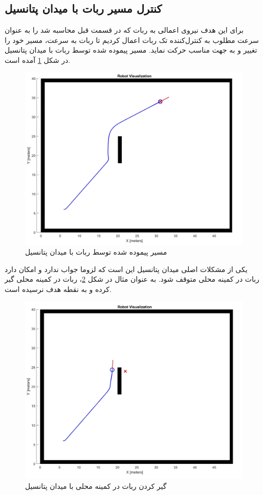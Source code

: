\subsection{کنترل مسیر ربات با میدان پتانسیل}
برای این هدف نیروی اعمالی به ربات که در قسمت قبل محاسبه شد را به عنوان سرعت مطلوب به کنترل‌کننده تک ربات اعمال کردیم تا ربات به سرعت، مسیر خود را تغییر و به جهت مناسب حرکت نماید. مسیر پیموده شده توسط ربات با میدان پتانسیل در شکل \ref{Fig potential-field-1robot-pos} آمده است.
\begin{figure}[!h]
	\centering
	\includegraphics[scale=0.28]{Images/potential-field-1robot-pos.jpg}
	\caption{مسیر پیموده شده توسط ربات با میدان پتانسیل}\label{Fig potential-field-1robot-pos}
\end{figure}

یکی از مشکلات اصلی میدان پتانسیل این است که لزوما جواب ندارد و امکان دارد ربات در کمینه محلی متوقف شود. به عنوان مثال در شکل \ref{Fig potential-field-1robot-stuck}، ربات در کمینه محلی گیر کرده و به نقطه هدف نرسیده است.
\begin{figure}[!h]
	\centering
	\includegraphics[scale=0.28]{Images/potential-field-1robot-stuck.jpg}
	\caption{گیر کردن ربات در کمینه محلی با میدان پتانسیل}\label{Fig potential-field-1robot-stuck}
\end{figure}

